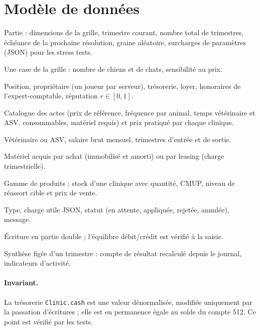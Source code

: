 \documentclass[11pt,a4paper]{article}
\newcommand{\code}[1]{\texttt{#1}}
\begin{document}
\section{Modèle de données}

\begin{description}[style=nextline]
\item[\code{GameServer}] Partie : dimensions de la grille, trimestre courant,
  nombre total de trimestres, échéance de la prochaine résolution, graine
  aléatoire, surcharges de paramètres (JSON) pour les stress tests.
\item[\code{PopulationZone}] Une case de la grille : nombre de chiens et de
  chats, sensibilité au prix.
\item[\code{Clinic}] Position, propriétaire (un joueur par serveur),
  trésorerie, loyer, honoraires de l'expert-comptable, réputation
  $r \in [0,1]$.
\item[\code{ServiceType} / \code{ClinicService}] Catalogue des actes (prix de
  référence, fréquence par animal, temps vétérinaire et ASV, consommables,
  matériel requis) et prix pratiqué par chaque clinique.
\item[\code{StaffMember}] Vétérinaire ou ASV, salaire brut mensuel,
  trimestres d'entrée et de sortie.
\item[\code{EquipmentType} / \code{ClinicEquipment}] Matériel acquis par achat
  (immobilisé et amorti) ou par leasing (charge trimestrielle).
\item[\code{ProductLine} / \code{StockItem}] Gamme de produits ; stock d'une
  clinique avec quantité, CMUP, niveau de réassort cible et prix de vente.
\item[\code{PendingDecision}] Type, charge utile JSON, statut (en attente,
  appliquée, rejetée, annulée), message.
\item[\code{JournalEntry} / \code{JournalLine}] Écriture en partie double ;
  l'équilibre débit/crédit est vérifié à la saisie.
\item[\code{QuarterReport}] Synthèse figée d'un trimestre : compte de
  résultat recalculé depuis le journal, indicateurs d'activité.
\end{description}

\paragraph{Invariant.} La trésorerie \code{Clinic.cash} est une valeur
dénormalisée, modifiée uniquement par la passation d'écritures ; elle est en
permanence égale au solde du compte 512. Ce point est vérifié par les tests.
\end{document}
